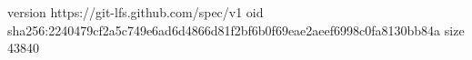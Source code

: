version https://git-lfs.github.com/spec/v1
oid sha256:2240479cf2a5c749e6ad6d4866d81f2bf6b0f69eae2aeef6998c0fa8130bb84a
size 43840

